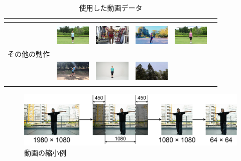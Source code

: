 \begin{table}[t]
\begin{center}
\begin{tabular}{|c|ccc|cc|}
        & \cite{manolo} & \cite{aito} & & \cite{hyoga} & \cite{legit}
      \\ \hline
        &&&&& \\
        & \includegraphics[width=17mm]{images/snaps/radio_exer.png}
        & \includegraphics[width=17mm]{images/snaps/posing.png}
        & \includegraphics[width=17mm]{images/snaps/shadowboxing.png}
        & \includegraphics[width=17mm]{images/snaps/radio_exer_2.png}
        &
      \\
      その他の動作 & \cite{radio} & \cite{posing} & \cite{boxing} & \cite{radio2} &
      \\
        & \includegraphics[width=17mm]{images/snaps/running.png}
        & \includegraphics[width=17mm]{images/snaps/shinkokyu.png}
        & \includegraphics[width=17mm]{images/snaps/leaves.png}
        &
        &
      \\
        & \cite{running} & \cite{shinkokyu} & \cite{leaves} & &
      \\ \hline
    \end{tabular}
  \end{center}
  \caption{使用した動画データ}
  \label{video_data}
\end{table}
\clearpage

\begin{figure}[t]
  \begin{center}
    \includegraphics[width=120mm]{images/chart/resize.pdf}
  \end{center}
  \caption{動画の縮小例}
  \label{resize}
\end{figure}

